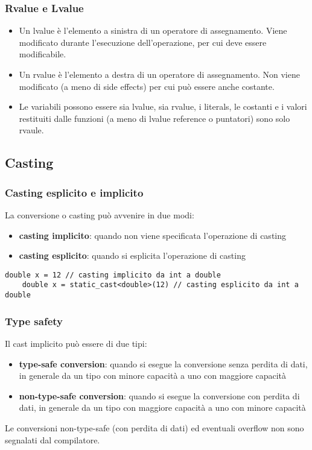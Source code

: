 \documentclass[a4paper]{article}
\begin{document}
\subsubsection*{Rvalue e Lvalue}
\begin{itemize}
	\item Un lvalue è l'elemento a sinistra di un operatore di assegnamento. Viene modificato durante l'esecuzione dell'operazione, per cui
	deve essere modificabile.
	\item Un rvalue è l'elemento a destra di un operatore di assegnamento. Non viene modificato (a meno di side effects) per cui può essere
	anche costante.
	\item Le variabili possono essere sia lvalue, sia rvalue, i literals, le costanti e i valori restituiti dalle funzioni (a meno di lvalue
	reference o puntatori) sono solo rvaule.
\end{itemize}

\newpage

\subsection{Casting} \label{casting}
\subsubsection*{Casting esplicito e implicito}
La conversione o casting può avvenire in due modi:
\begin{itemize}
	\item \textbf{casting implicito}: quando non viene specificata l'operazione di casting
	\item \textbf{casting esplicito}: quando si esplicita l'operazione di casting
\end{itemize}
\begin{lstlisting}[numbers=none]
	double x = 12 // casting implicito da int a double
	double x = static_cast<double>(12) // casting esplicito da int a double
\end{lstlisting}

\subsubsection*{Type safety}
Il cast implicito può essere di due tipi:
\begin{itemize}
	\item \textbf{type-safe conversion}: quando si esegue la conversione senza perdita di dati, in generale da un tipo con
	minore capacità a uno con maggiore capacità
	\item \textbf{non-type-safe conversion}: quando si esegue la conversione con perdita di dati, in generale da un tipo con
	maggiore capacità a uno con minore capacità
\end{itemize}
Le conversioni non-type-safe (con perdita di dati) ed eventuali overflow non sono segnalati dal compilatore.
\end{document}
